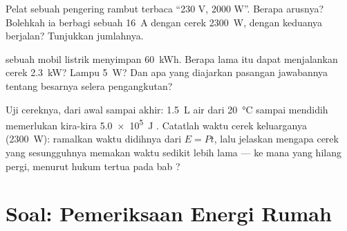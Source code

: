 \begin{exercise}[$\star\star$]\label{exo:g9:electric-power-energy:10}
Pelat sebuah pengering rambut terbaca ``230 V, 2000 W''. Berapa
arusnya? Bolehkah ia berbagi sebuah  \qty{16}{A} dengan cerek
\qty{2300}{W}, dengan keduanya berjalan? Tunjukkan jumlahnya.
\end{exercise}

\begin{exercise}[$\star\star$]\label{exo:g9:electric-power-energy:11}
 sebuah mobil listrik menyimpan \qty{60}{kWh}. Berapa lama itu
dapat menjalankan cerek \qty{2.3}{kW}? Lampu \qty{5}{W}? Dan apa yang
diajarkan pasangan jawabannya tentang besarnya selera 
pengangkutan?
\end{exercise}

\begin{exercise}[$\star\star\star$]\label{exo:g9:electric-power-energy:12}
Uji cereknya, dari awal sampai akhir: \qty{1.5}{L} air dari
\qty{20}{\celsius} sampai mendidih memerlukan kira-kira \qty{5.0e5}{J}
. Catatlah waktu cerek keluarganya (\qty{2300}{W}): ramalkan
waktu didihnya dari $E = P t$, lalu jelaskan mengapa cerek yang
sesungguhnya memakan waktu sedikit lebih lama --- ke mana  yang
hilang pergi, menurut hukum tertua pada bab ?
\end{exercise}

\section{Soal: Pemeriksaan Energi Rumah}

